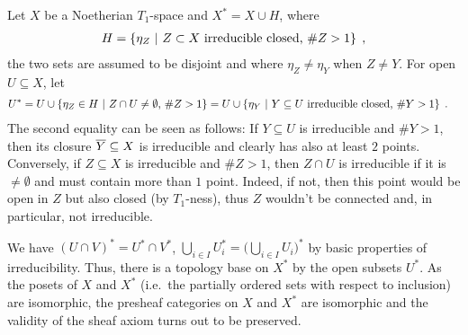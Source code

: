 \documentclass[a4paper,parskip=half,numbers=enddot, DIV=12]{scrreprt}
\begin{document}
Let $X$ be a Noetherian $T_1$-space and $X^* = X\cup H $, where 
\begin{align*}
    H= \left\{\eta_Z\ \middle|\  Z\subset X \text{ irreducible closed, }\#Z> 1\right\}\;,
\end{align*}
the two sets are assumed to be disjoint and where $\eta_Z\neq \eta_Y$ when $Z\neq Y$. For open $U\subseteq X$, let 
\begin{align*}
    U^* &= U \cup \left\{\eta_Z\in H\ \middle|\  Z\cap U \neq \emptyset\text{, }\# Z > 1\right\} = U\cup \left\{\eta_Y \ \middle|\  Y\subseteq U\text{ irreducible closed, }\#Y > 1\right\}\;.
\end{align*}
The second equality can be seen as follows: If $Y\subseteq U$ is irreducible and $\#Y>1$, then its closure $\overline Y\subseteq X$ is irreducible and clearly has also at least $2$ points. Conversely, if $Z\subseteq X$ is irreducible and $\# Z>1$, then $Z\cap U$ is irreducible if it is $\neq\emptyset$ and must contain more than $1$ point. Indeed, if not, then this point would be open in $Z$ but also closed (by $T_1$-ness), thus $Z$ wouldn't be connected and, in particular, not irreducible.

We have $(U\cap V)^* = U^* \cap V^*$, $\bigcup_{i\in I} U_i^* = \big(\bigcup_{i\in I} U_i\big)^*$ by basic properties of irreducibility. Thus, there is a topology base on $X^*$ by the open subsets $U^*$. As the posets of $X$ and $X^*$ (i.e.\ the partially ordered sets with respect to inclusion) are isomorphic, the presheaf categories on $X$ and $X^*$ are isomorphic and the validity of the sheaf axiom turns out to be preserved. 
\end{document}

